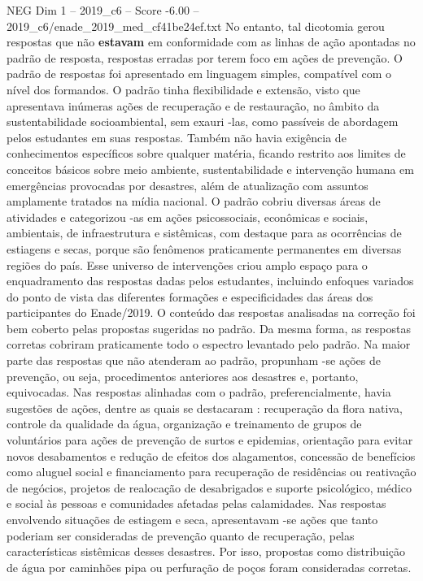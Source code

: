 \begin{textsample}{NEG Dim 1 – 2019\_c6 – Score -6.00 – 2019\_c6/enade\_2019\_med\_cf41be24ef.txt}
No entanto, tal dicotomia gerou respostas que não \textbf{estavam} em conformidade com as linhas de ação apontadas no padrão de resposta, respostas erradas por terem foco em ações de prevenção.
O padrão de respostas foi apresentado em linguagem simples, compatível com o nível dos formandos.
O padrão tinha flexibilidade e extensão, visto que apresentava inúmeras ações de recuperação e de restauração, no âmbito da sustentabilidade socioambiental, sem exauri -las, como passíveis de abordagem pelos estudantes em suas respostas.
Também não havia exigência de conhecimentos específicos sobre qualquer matéria, ficando restrito aos limites de conceitos básicos sobre meio ambiente, sustentabilidade e intervenção humana em emergências provocadas por desastres, além de atualização com assuntos amplamente tratados na mídia nacional.
O padrão cobriu diversas áreas de atividades e categorizou -as em ações psicossociais, econômicas e sociais, ambientais, de infraestrutura e sistêmicas, com destaque para as ocorrências de estiagens e secas, porque são fenômenos praticamente permanentes em diversas regiões do país.
Esse universo de intervenções criou amplo espaço para o enquadramento das respostas dadas pelos estudantes, incluindo enfoques variados do ponto de vista das diferentes formações e especificidades das áreas dos participantes do Enade/2019.
O conteúdo das respostas analisadas na correção foi bem coberto pelas propostas sugeridas no padrão.
Da mesma forma, as respostas corretas cobriram praticamente todo o espectro levantado pelo padrão.
Na maior parte das respostas que não atenderam ao padrão, propunham -se ações de prevenção, ou seja, procedimentos anteriores aos desastres e, portanto, equivocadas.
Nas respostas alinhadas com o padrão, preferencialmente, havia sugestões de ações, dentre as quais se destacaram : recuperação da flora nativa, controle da qualidade da água, organização e treinamento de grupos de voluntários para ações de prevenção de surtos e epidemias, orientação para evitar novos desabamentos e redução de efeitos dos alagamentos, concessão de benefícios como aluguel social e financiamento para recuperação de residências ou reativação de negócios, projetos de realocação de desabrigados e suporte psicológico, médico e social às pessoas e comunidades afetadas pelas calamidades.
Nas respostas envolvendo situações de estiagem e seca, apresentavam -se ações que tanto poderiam ser consideradas de prevenção quanto de recuperação, pelas características sistêmicas desses desastres.
Por isso, propostas como distribuição de água por caminhões pipa ou perfuração de poços foram consideradas corretas.

\end{textsample}
